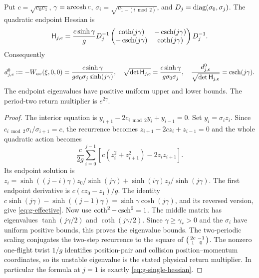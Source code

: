 \begin{lemma}\label{lem:g-jacobi}
Put $c=\sqrt{c_0c_1}$, $\gamma=\operatorname{arcosh} c$,
$\sigma_i=\sqrt{c_{1-(i\bmod2)}}$, and
$D_j=\operatorname{diag}(\sigma_0,\sigma_j)$. The quadratic endpoint Hessian is
\begin{equation}\label{eq:g-effective}
 \mathsf H_{j,e}=\frac{c\sinh\gamma}{g}D_j^{-1}
 \begin{pmatrix}\coth(j\gamma)&-\operatorname{csch}(j\gamma)\\
 -\operatorname{csch}(j\gamma)&\coth(j\gamma)\end{pmatrix}D_j^{-1}.
\end{equation}
Consequently
\begin{equation}\label{eq:g-ratio}
 d^0_{j,e}:=-W_{uv}(\xi,0,0)
  =\frac{c\sinh\gamma}{g\sigma_0\sigma_j\sinh(j\gamma)},\quad
 \sqrt{\det\mathsf H_{j,e}}=\frac{c\sinh\gamma}{g\sigma_0\sigma_j},\quad
 \frac{d^0_{j,e}}{\sqrt{\det\mathsf H_{j,e}}}=\operatorname{csch}(j\gamma).
\end{equation}
The endpoint eigenvalues have positive uniform upper and lower bounds.
The period-two return multiplier is $e^{2\gamma}$.
\end{lemma}
\begin{proof}
The interior equation is
$y_{i+1}-2c_{i\bmod2}y_i+y_{i-1}=0$. Set $y_i=\sigma_i z_i$.
Since $c_{i\bmod2}\sigma_i/\sigma_{i+1}=c$, the recurrence becomes
$z_{i+1}-2cz_i+z_{i-1}=0$ and the whole quadratic action becomes
\[
 \frac c{2g}\sum_{i=0}^{j-1}
       [c(z_i^2+z_{i+1}^2)-2z_iz_{i+1}].
\]
Its endpoint solution is
$z_i=\sinh((j-i)\gamma)z_0/\sinh(j\gamma)
      +\sinh(i\gamma)z_j/\sinh(j\gamma)$.
The first endpoint derivative is $c(cz_0-z_1)/g$.
The identity
$c\sinh(j\gamma)-\sinh((j-1)\gamma)
 =\sinh\gamma\cosh(j\gamma)$, and its reversed version, give
\eqref{eq:g-effective}. Now use $\coth^2-\operatorname{csch}^2=1$.
The middle matrix has eigenvalues $\tanh(j\gamma/2)$ and
$\coth(j\gamma/2)$. Since $\gamma\ge\gamma_*>0$ and the
$\sigma_i$ have uniform positive bounds, this proves the eigenvalue
bounds. The two-periodic scaling conjugates the two-step recurrence
to the square of $\begin{psmallmatrix}2c&-1\\1&0\end{psmallmatrix}$.
The nonzero one-flight twist $1/g$ identifies position-pair and
collision position--momentum coordinates, so its unstable eigenvalue
is the stated physical return multiplier. In particular the formula
at $j=1$ is exactly \eqref{eq:g-single-hessian}.
\end{proof}

